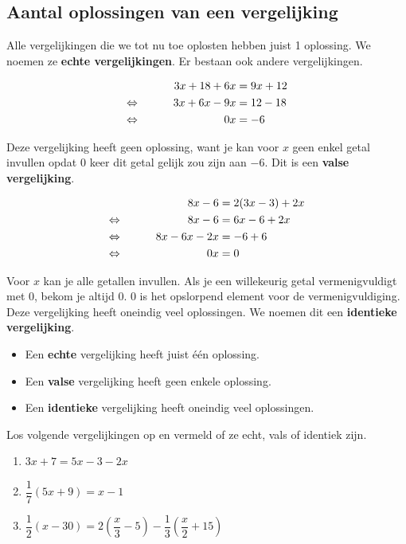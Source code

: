 \documentclass{bis}
\begin{document}
\subsection{Aantal oplossingen van een vergelijking}

Alle vergelijkingen die we tot nu toe oplosten hebben juist 1 oplossing. We noemen ze {\bf echte vergelijkingen}. Er bestaan ook andere vergelijkingen.

\begin{voorbeeld}
\begin{alignat*}{2}
     && 3x + 18 + 6x &= 9x + 12\\
\Leftrightarrow\mkern40mu && 3x + 6x - 9x &= 12 - 18\\
\Leftrightarrow\mkern40mu && 0x	&= - 6
\end{alignat*}
\end{voorbeeld}

Deze vergelijking heeft geen oplossing, want je kan voor $x$ geen enkel getal invullen opdat $0$ keer dit getal gelijk zou zijn aan $-6$. Dit is een {\bf valse vergelijking}.

\begin{voorbeeld}
\begin{alignat*}{2}
     && 8x - 6	&= 2(3x - 3) + 2x\\
\Leftrightarrow\mkern40mu && 8x - 6	&= 6x - 6 + 2x\\
\Leftrightarrow\mkern40mu && 8x - 6x - 2x	&= - 6 + 6\\
\Leftrightarrow\mkern40mu && 0x	&= 0
\end{alignat*}
\end{voorbeeld}

Voor $x$ kan je alle getallen invullen. Als je een willekeurig getal vermenigvuldigt met 0, bekom je altijd 0. 0 is het opslorpend element voor de vermenigvuldiging. Deze vergelijking heeft oneindig veel oplossingen. We noemen dit een {\bf identieke vergelijking}.

\begin{onthoud}
\begin{itemize}
  \item Een {\bf echte} vergelijking heeft juist één oplossing.
  \item Een {\bf valse} vergelijking heeft geen enkele oplossing.
  \item Een {\bf identieke} vergelijking heeft oneindig veel oplossingen.
\end{itemize}
\end{onthoud}

\begin{exercise}
Los volgende vergelijkingen op en vermeld of ze echt, vals of identiek zijn.
\begin{enumerate}
  \item $3x + 7 = 5x - 3 - 2x$
  \item $\dfrac{1}{7}(5x+9) = x - 1$
  \item $\dfrac{1}{2}(x-30)=2(\dfrac{x}{3}-5)-\dfrac{1}{3}(\dfrac{x}{2}+15)$
\end{enumerate}
\end{exercise}
\end{document}
